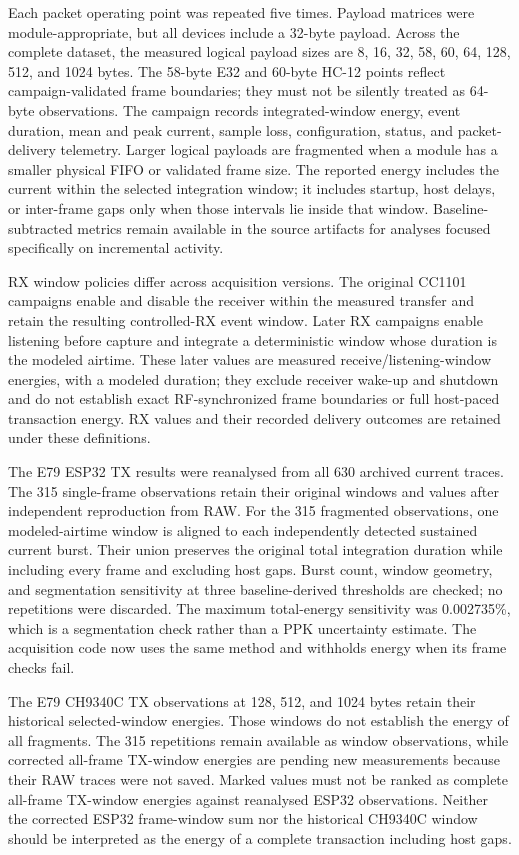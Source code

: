 \documentclass[10pt,a4paper]{article}
\begin{document}
Each packet operating point was repeated five times. Payload matrices were module-appropriate, but all devices include a 32-byte payload. Across the complete dataset, the measured logical payload sizes are 8, 16, 32, 58, 60, 64, 128, 512, and 1024 bytes. The 58-byte E32 and 60-byte HC-12 points reflect campaign-validated frame boundaries; they must not be silently treated as 64-byte observations. The campaign records integrated-window energy, event duration, mean and peak current, sample loss, configuration, status, and packet-delivery telemetry. Larger logical payloads are fragmented when a module has a smaller physical FIFO or validated frame size. The reported energy includes the current within the selected integration window; it includes startup, host delays, or inter-frame gaps only when those intervals lie inside that window. Baseline-subtracted metrics remain available in the source artifacts for analyses focused specifically on incremental activity.

RX window policies differ across acquisition versions. The original CC1101 campaigns enable and disable the receiver within the measured transfer and retain the resulting controlled-RX event window. Later RX campaigns enable listening before capture and integrate a deterministic window whose duration is the modeled airtime. These later values are measured receive/listening-window energies, with a modeled duration; they exclude receiver wake-up and shutdown and do not establish exact RF-synchronized frame boundaries or full host-paced transaction energy. RX values and their recorded delivery outcomes are retained under these definitions.

The E79 ESP32 TX results were reanalysed from all 630 archived current traces. The 315 single-frame observations retain their original windows and values after independent reproduction from RAW. For the 315 fragmented observations, one modeled-airtime window is aligned to each independently detected sustained current burst. Their union preserves the original total integration duration while including every frame and excluding host gaps. Burst count, window geometry, and segmentation sensitivity at three baseline-derived thresholds are checked; no repetitions were discarded. The maximum total-energy sensitivity was 0.002735\%, which is a segmentation check rather than a PPK uncertainty estimate. The acquisition code now uses the same method and withholds energy when its frame checks fail.

The E79 CH9340C TX observations at 128, 512, and 1024 bytes retain their historical selected-window energies. Those windows do not establish the energy of all fragments. The 315 repetitions remain available as window observations, while corrected all-frame TX-window energies are pending new measurements because their RAW traces were not saved. Marked values must not be ranked as complete all-frame TX-window energies against reanalysed ESP32 observations. Neither the corrected ESP32 frame-window sum nor the historical CH9340C window should be interpreted as the energy of a complete transaction including host gaps.
\end{document}
